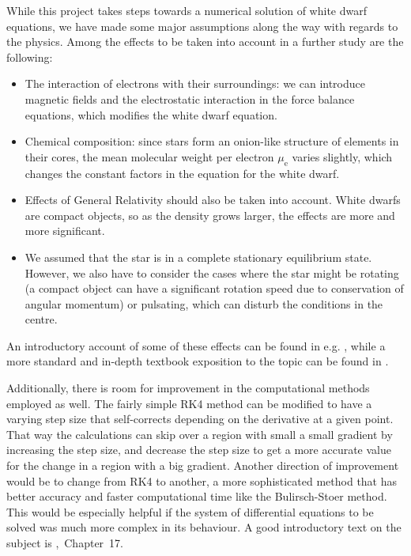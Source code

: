 \documentclass[]{article}
\begin{document}
	While this project takes steps towards a numerical solution of white dwarf equations, we have made some major assumptions along the way with regards to the physics. Among the effects to be taken into account in a further study are the following:
	\begin{itemize}
		\item The interaction of electrons with their surroundings: we can introduce magnetic fields and the electrostatic interaction in the force balance equations, which modifies the white dwarf equation.
		\item Chemical composition: since stars form an onion-like structure of elements in their cores, the mean molecular weight per electron $\mu_\mathrm{e}$ varies slightly, which changes the constant factors in the equation for the white dwarf.
		\item Effects of General Relativity should also be taken into account. White dwarfs are compact objects, so as the density grows larger, the effects are more and more significant.
		\item We assumed that the star is in a complete stationary equilibrium state. However, we also have to consider the cases where the star might be rotating (a compact object can have a significant rotation speed due to conservation of angular momentum) or pulsating, which can disturb the conditions in the centre.
	\end{itemize}
	An introductory account of some of these effects can be found in e.g. \cite{Sagert2005}, while a more standard and in-depth textbook exposition to the topic can be found in \cite{Shapiro1991}.

	Additionally, there is room for improvement in the computational methods employed as well. The fairly simple RK4 method can be modified to have a varying step size that self-corrects depending on the derivative at a given point. That way the calculations can skip over a region with small a small gradient by increasing the step size, and decrease the step size to get a more accurate value for the change in a region with a big gradient. Another direction of improvement would be to change from RK4 to another, a more sophisticated method that has better accuracy and faster computational time like the Bulirsch-Stoer method. This would be especially helpful if the system of differential equations to be solved was much more complex in its behaviour. A good introductory text on the subject is \cite{Press2007},~Chapter~17.


\renewcommand{\bibname}{References}

\end{document}

